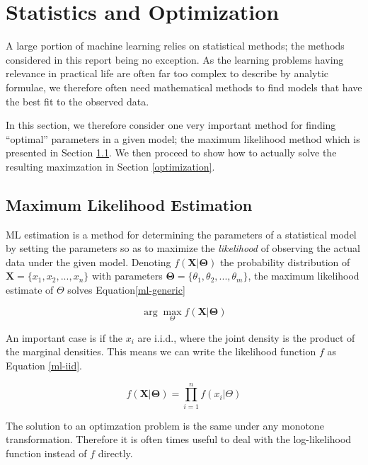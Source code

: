 \documentclass[11pt, oneside, a4paper]{report}
\begin{document}
\section{Statistics and Optimization}

A large portion of machine learning relies on statistical
methods; the methods considered in this report being no exception. As the learning problems having relevance in practical life are often
far too complex to describe by analytic formulae, we therefore often
need mathematical methods to find models that have the best fit to the
observed data. 

In this section, we therefore consider one very
important method for finding ``optimal'' parameters in a given model;
the maximum likelihood method which is presented in Section
\ref{ml-estimation}. We then proceed to show how to actually solve
the resulting maximzation in Section \ref{optimization}.


\subsection{Maximum Likelihood Estimation}\label{ml-estimation}

ML estimation is a method for determining the parameters of a
statistical model by setting the parameters so as to maximize the
\emph{likelihood} of observing the actual data under the given
model. Denoting $f(\boldsymbol{X}|\boldsymbol{\Theta})$ the
probability distribution of $\boldsymbol{X} = \{x_1,x_2,...,x_n\}$
with parameters $\boldsymbol{\Theta} = \{\theta_1, \theta_2, ...,
\theta_m\}$, the maximum likelihood estimate of $\Theta$ solves Equation\ref{ml-generic}

\begin{equation}
  \label{ml-generic}
  \arg \max_\Theta f(\boldsymbol{X}|\boldsymbol{\Theta})
\end{equation}

An important case is if the $x_i$ are i.i.d., where the joint density
is the product of the marginal densities. This means we can write the
likelihood function $f$ as Equation \ref{ml-iid}.

\begin{equation}  
  \label{ml-iid}
  f(\boldsymbol{X}|\boldsymbol{\Theta}) = \prod_{i = 1}^n f(x_i|\Theta)
\end{equation}

The solution to an optimzation problem is the same under any monotone transformation. Therefore it is often times useful to deal with the log-likelihood function instead of $f$ directly.
\end{document}
